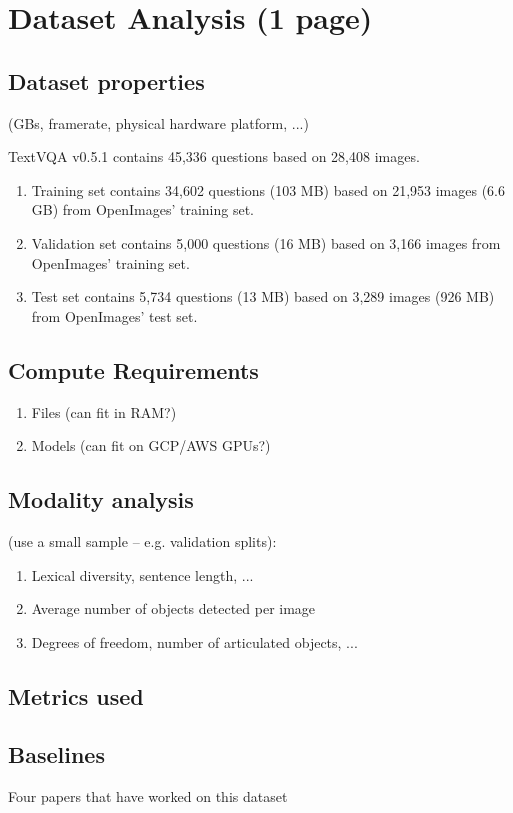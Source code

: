 \documentclass[11pt,a4paper]{article}
\begin{document}
\clearpage
\section{Dataset Analysis (1 page)}
\subsection{Dataset properties} (GBs, framerate, physical hardware platform, ...)

TextVQA v0.5.1 contains 45,336 questions based on 28,408 images. 
\begin{enumerate}
	\item Training set contains 34,602 questions (103 MB) based on 21,953 images (6.6 GB) from OpenImages' training set. 
	\item Validation set contains 5,000 questions (16 MB) based on 3,166 images from OpenImages' training set. 
	\item Test set contains 5,734 questions (13 MB) based on 3,289 images (926 MB) from OpenImages' test set.

\end{enumerate}

\subsection{Compute Requirements}
  \begin{enumerate}
    \item Files (can fit in RAM?)
    \item Models (can fit on GCP/AWS GPUs?)
  \end{enumerate}
\subsection{Modality analysis}
(use a small sample -- e.g. validation splits):
  \begin{enumerate}
    \item Lexical diversity, sentence length, ...
    \item Average number of objects detected per image
    \item Degrees of freedom, number of articulated objects, ...
  \end{enumerate}
\subsection{Metrics used}
\subsection{Baselines} 
Four papers that have worked on this dataset
\end{document}
